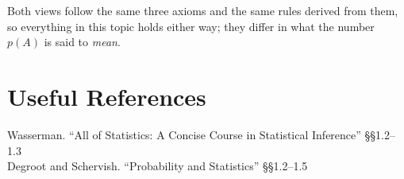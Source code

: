 Both views follow the same three axioms and the same rules derived from them,
so everything in this topic holds either way; they differ in what the number $p(A)$ is said to \emph{mean}.

\section*{Useful References}
Wasserman. ``All of Statistics: A Concise Course in Statistical Inference'' \S\S 1.2--1.3\\
Degroot and Schervish. ``Probability and Statistics'' \S\S 1.2--1.5


